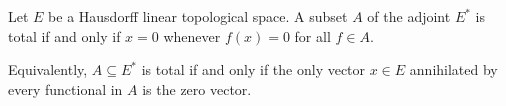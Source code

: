Let $E$ be a Hausdorff linear topological space. A subset $A$ of the adjoint $E^*$ is total if and only if $x = 0$ whenever $f(x) = 0$ for all $f \in A$.

Equivalently, $A \subseteq E^*$ is total if and only if the only vector $x \in E$ annihilated by every functional in $A$ is the zero vector.
